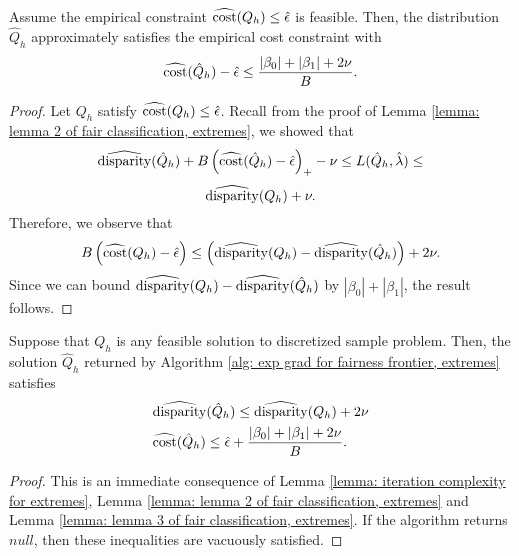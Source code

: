 \documentclass{article}
\begin{document}
\begin{lemma}\label{lemma: lemma 3 of fair classification, extremes}
    Assume the empirical constraint $\widehat{\operatorname{cost}}(Q_h) \leq \hat{\epsilon}$ is feasible. Then, the distribution $\hat{Q}_h$ approximately satisfies the empirical cost constraint with
        \begin{equation*}
            \widehat{\operatorname{cost}}(\hat{Q}_h) - \hat{\epsilon} \leq \frac{|\beta_0| + |\beta_1| + 2 \nu}{B}.
        \end{equation*}
     
    \begin{proof}
        Let $Q_h$ satisfy $\widehat{\operatorname{cost}}(Q_h) \leq \hat{\epsilon}$. Recall from the proof of Lemma \ref{lemma: lemma 2 of fair classification, extremes}, we showed that
        \[
        \widehat{\operatorname{disparity}}(\hat{Q}_h) + B \left( \widehat{\operatorname{cost}}(\hat{Q}_h) - \hat{\epsilon} \right)_{+} - \nu \leq L(\hat{Q}_h, \hat{\lambda}) \leq
        \]
        \[
        \widehat{\operatorname{disparity}}(Q_h) + \nu.
        \]
        Therefore, we observe that 
            \begin{equation*}
                B \left( \widehat{\operatorname{cost}}(Q_h) - \hat{\epsilon} \right) \leq \left( \widehat{\operatorname{disparity}}(Q_h) - \widehat{\operatorname{disparity}}(\hat{Q}_h) \right) + 2\nu.
            \end{equation*}
        Since we can bound $\widehat{\operatorname{disparity}}(Q_h) - \widehat{\operatorname{disparity}}(\hat{Q}_h)$ by $|\beta_0| + |\beta_1|$, the result follows.
    \end{proof}
\end{lemma}

\begin{lemma}\label{lemma: solution quality of exp grad for extremes}
    Suppose that $Q_h$ is any feasible solution to discretized sample problem. Then, the solution $\hat{Q}_h$ returned by Algorithm \ref{alg: exp grad for fairness frontier, extremes} satisfies 
        \begin{align*}
            & \widehat{\operatorname{disparity}}(\hat{Q}_h) \leq \widehat{\operatorname{disparity}}(Q_h) + 2 \nu \\
            & \widehat{\operatorname{cost}}(\hat{Q}_h) \leq \hat{\epsilon} + \frac{|\beta_0| + |\beta_1| + 2\nu}{B}.
        \end{align*}
        
    \begin{proof}
        This is an immediate consequence of Lemma \ref{lemma: iteration complexity for extremes}, Lemma \ref{lemma: lemma 2 of fair classification, extremes} and Lemma \ref{lemma: lemma 3 of fair classification, extremes}. If the algorithm returns $null$, then these inequalities are vacuously satisfied. 
    \end{proof}
\end{lemma}
\end{document}
